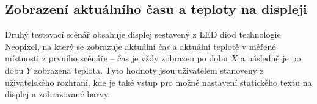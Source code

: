 \subsection{Zobrazení aktuálního času a teploty na displeji}\label{subsec:scenar-2}

Druhý testovací scénář obsahuje displej sestavený z LED diod technologie Neopixel, na který se zobrazuje aktuální čas
a aktuální teplotě v měřené místnosti z prvního scénáře -- čas je vždy zobrazen po dobu $X$ a následně je po dobu $Y$
zobrazena teplota.
Tyto hodnoty jsou uživatelem stanoveny z uživatelského rozhraní, kde je také vstup pro možné nastavení statického
textu na displej a zobrazované barvy.




